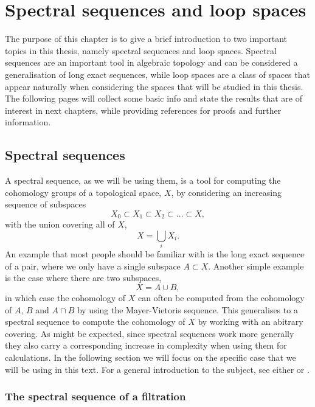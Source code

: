 
\chapter{Spectral sequences and loop spaces}
\label{chap:generelt}

The purpose of this chapter is to give a brief introduction to two
important topics in this thesis, namely spectral sequences and loop
spaces. Spectral sequences are an important tool in algebraic topology
and can be considered a generalisation of long exact sequences, while
loop spaces are a class of spaces that appear naturally when
considering the spaces that will be studied in this thesis. The
following pages will collect some basic info and state the results
that are of interest in next chapters, while providing references for
proofs and further information. 

\section{Spectral sequences}
\label{sec:ss}

A spectral sequence, as we will be using them, is a tool for computing
the cohomology groups of a topological space, $X$, by considering an
increasing sequence of subspaces
\[ X_0 \subset X_1 \subset X_2 \subset \dots \subset X, \]
with the union covering all of $X$,
\[ X = \bigcup_{i} X_i. \]
An example that most people should be familiar with is the long exact
sequence of a pair, where
we only have a single subspace $A \subset X$. Another simple example
is the case where there are two subspaces,
\[ X = A \cup B, \]
in which case the cohomology of $X$ can often be computed from the
cohomology of $A$, $B$ and $A\cap B$ by using the Mayer-Vietoris
sequence. This generalises to a spectral sequence to compute
the cohomology of $X$ by working with an abitrary covering. As might
be expected, since spectral sequences work more generally they also
carry a corresponding increase in complexity when using them for
calculations. In the following section we will focus on the specific
case that 
we will be using in this text. For a general introduction to the
subject, see either \cite{hatcherss} or \cite{mccleary}.

\subsection{The spectral sequence of a filtration}
\label{sec:ss-filtration}

